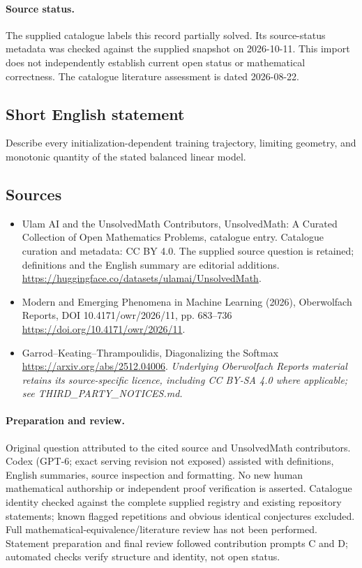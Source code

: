 \documentclass[11pt]{article}
\begin{document}
\paragraph{Source status.}
The supplied catalogue labels this record partially solved. Its source-status metadata was checked against the supplied snapshot on 2026-10-11. This import does not independently establish current open status or mathematical correctness. The catalogue literature assessment is dated 2026-08-22.
\subsection{Short English statement}
Describe every initialization-dependent training trajectory, limiting geometry, and monotonic quantity of the stated balanced linear model.
\subsection{Sources}
\begin{itemize}
\item[\hypertarget{source:statement:1}{S1}] Ulam AI and the UnsolvedMath Contributors, UnsolvedMath: A Curated Collection of Open Mathematics Problems, catalogue entry. Catalogue curation and metadata: CC BY 4.0. The supplied source question is retained; definitions and the English summary are editorial additions.
\url{https://huggingface.co/datasets/ulamai/UnsolvedMath}.
\item[\hypertarget{source:statement:2}{S2}] Modern and Emerging Phenomena in Machine Learning (2026), Oberwolfach Reports, DOI 10.4171/owr/2026/11, pp. 683--736
\url{https://doi.org/10.4171/owr/2026/11}.
\item[\hypertarget{source:statement:3}{S3}] Garrod--Keating--Thrampoulidis, Diagonalizing the Softmax
\url{https://arxiv.org/abs/2512.04006}.
\textit{Underlying Oberwolfach Reports material retains its source-specific licence, including CC BY-SA 4.0 where applicable; see THIRD\_PARTY\_NOTICES.md.}
\end{itemize}
\paragraph{Preparation and review.}
Original question attributed to the cited source and UnsolvedMath contributors. Codex (GPT-6; exact serving revision not exposed) assisted with definitions, English summaries, source inspection and formatting. No new human mathematical authorship or independent proof verification is asserted. Catalogue identity checked against the complete supplied registry and existing repository statements; known flagged repetitions and obvious identical conjectures excluded. Full mathematical-equivalence/literature review has not been performed. Statement preparation and final review followed contribution prompts C and D; automated checks verify structure and identity, not open status.
\label{end:statement}
\end{document}

